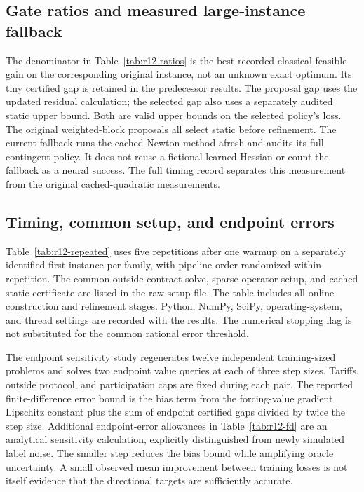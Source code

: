 \subsection{Gate ratios and measured large-instance fallback}
The denominator in Table~\ref{tab:r12-ratios} is the best recorded classical feasible gain on the corresponding original instance, not an unknown exact optimum. Its tiny certified gap is retained in the predecessor results. The proposal gap uses the updated residual calculation; the selected gap also uses a separately audited static upper bound. Both are valid upper bounds on the selected policy's loss. The original weighted-block proposals all select static before refinement. The current fallback runs the cached Newton method afresh and audits its full contingent policy. It does not reuse a fictional learned Hessian or count the fallback as a neural success. The full timing record separates this measurement from the original cached-quadratic measurements.


\subsection{Timing, common setup, and endpoint errors}
Table~\ref{tab:r12-repeated} uses five repetitions after one warmup on a separately identified first instance per family, with pipeline order randomized within repetition. The common outside-contract solve, sparse operator setup, and cached static certificate are listed in the raw setup file. The table includes all online construction and refinement stages. Python, NumPy, SciPy, operating-system, and thread settings are recorded with the results. The numerical stopping flag is not substituted for the common rational error threshold.


The endpoint sensitivity study regenerates twelve independent training-sized problems and solves two endpoint value queries at each of three step sizes. Tariffs, outside protocol, and participation caps are fixed during each pair. The reported finite-difference error bound is the bias term from the forcing-value gradient Lipschitz constant plus the sum of endpoint certified gaps divided by twice the step size. Additional endpoint-error allowances in Table~\ref{tab:r12-fd} are an analytical sensitivity calculation, explicitly distinguished from newly simulated label noise. The smaller step reduces the bias bound while amplifying oracle uncertainty. A small observed mean improvement between training losses is not itself evidence that the directional targets are sufficiently accurate.


